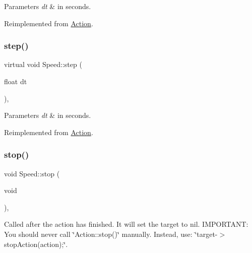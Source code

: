 \begin{DoxyParams}{Parameters}
{\em dt} & in seconds. \\
\hline
\end{DoxyParams}


Reimplemented from \hyperlink{classAction_a9a64ee9e8e977672748f70893ebaff66}{Action}.

\mbox{\label{classSpeed_affaf70de829e3452df106ec55a238807}} 
\subsubsection{\texorpdfstring{step()}{step()}\hspace{0.1cm}{\footnotesize\ttfamily [2/2]}}
{\footnotesize\ttfamily virtual void Speed\+::step (\begin{DoxyParamCaption}\item[{float}]{dt }\end{DoxyParamCaption})\hspace{0.3cm}{\ttfamily [override]}, {\ttfamily [virtual]}}


\begin{DoxyParams}{Parameters}
{\em dt} & in seconds. \\
\hline
\end{DoxyParams}


Reimplemented from \hyperlink{classAction_a9a64ee9e8e977672748f70893ebaff66}{Action}.

\mbox{\label{classSpeed_afc0df0c91cfcb119182fec7ccf470f45}} 
\subsubsection{\texorpdfstring{stop()}{stop()}\hspace{0.1cm}{\footnotesize\ttfamily [1/2]}}
{\footnotesize\ttfamily void Speed\+::stop (\begin{DoxyParamCaption}\item[{void}]{ }\end{DoxyParamCaption})\hspace{0.3cm}{\ttfamily [override]}, {\ttfamily [virtual]}}

Called after the action has finished. It will set the \textquotesingle{}target\textquotesingle{} to nil. I\+M\+P\+O\+R\+T\+A\+NT\+: You should never call \char`\"{}\+Action\+::stop()\char`\"{} manually. Instead, use\+: \char`\"{}target-\/$>$stop\+Action(action);\char`\"{}. 

